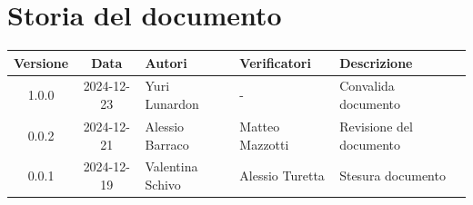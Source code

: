 \section*{Storia del documento}
\begin{tabularx}{\textwidth}{ c c p{3cm} p{3.17cm} X }
    \rowcolor{gray!20}\rule{0pt}{0.5cm}\textbf{Versione} & \textbf{Data} & \textbf{Autori} & \textbf{Verificatori} & \textbf{Descrizione} \\[0.7ex]
    
    \hline
    \rule{0pt}{0.5cm}1.0.0 & 2024-12-23 &  Yuri Lunardon & - & Convalida documento\\[0.7ex] 
    \rule{0pt}{0.5cm}0.0.2 & 2024-12-21 &  Alessio Barraco & Matteo Mazzotti & Revisione del documento\\[0.7ex] 
    \rule{0pt}{0.5cm}0.0.1 & 2024-12-19 &  Valentina Schivo & Alessio Turetta & Stesura documento\\[0.7ex] 
\end{tabularx}
